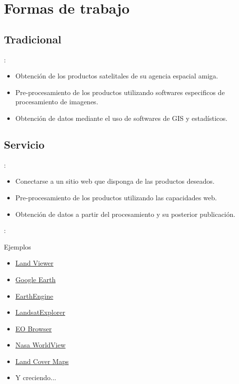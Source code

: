 \documentclass[handout,aspectratio=169]{beamer}
\begin{document}
\section{Formas de trabajo}
\subsection{Tradicional}
\begin{frame}{\secname : \subsecname}
    \begin{itemize}[<+->]
        \item Obtención de los productos satelitales de su agencia espacial amiga.
        \item Pre-procesamiento de los productos utilizando softwares especificos de procesamiento de imagenes.
        \item Obtención de datos mediante el uso de softwares de GIS y estadísticos.
    \end{itemize}
\end{frame}

\subsection{Servicio}
\begin{frame}{\secname : \subsecname}
    \begin{itemize}[<+->]
        \item Conectarse a un sitio web que disponga de las productos deseados.
        \item Pre-procesamiento de los productos utilizando las capacidades web.
        \item Obtención de datos a partir del procesamiento y su posterior publicación.
    \end{itemize}
\end{frame}

\begin{frame}{\secname : \subsecname}
    \begin{exampleblock}{Ejemplos}
        \begin{itemize}
            \item \href{http://lv.eosda.com}{Land Viewer}
            \item \href{https://earth.google.com/web/}{Google Earth}
            \item \href{https://earthengine.google.com}{EarthEngine}
            \item \href{http://landsatexplorer.esri.com/}{LandsatExplorer}
            \item \href{http://apps.sentinel-hub.com/eo-browser/}{EO Browser}
            \item \href{https://worldview.earthdata.nasa.gov/}{Nasa WorldView}
            \item \href{http://maps.elie.ucl.ac.be/CCI/viewer/index.php}{Land Cover Maps}
            \item Y creciendo...
        \end{itemize}
    \end{exampleblock}
\end{frame}
\end{document}
